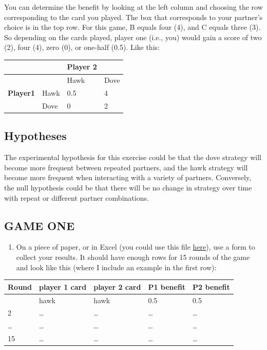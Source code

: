 \documentclass[
  a4paper]{book}
\providecommand{\tightlist}{%
  \setlength{\itemsep}{0pt}\setlength{\parskip}{0pt}}
\begin{document}
You can determine the benefit by looking at the left column and choosing the row corresponding to the card you played. The box that corresponds to your partner's choice is in the top row. For this game, B equals four (4), and C equals three (3). So depending on the cards played, player one (i.e., you) would gain a score of two (2), four (4), zero (0), or one-half (0.5). Like this:

\begin{longtable}[]{@{}llll@{}}
\toprule\noalign{}
& & Player 2 & \\
\midrule\noalign{}
\endhead
\bottomrule\noalign{}
\endlastfoot
& & Hawk & Dove \\
\textbf{Player1} & Hawk & 0.5 & 4 \\
& Dove & 0 & 2 \\
\end{longtable}

\subsection{Hypotheses}\label{hypotheses}

The experimental hypothesis for this exercise could be that the dove strategy will become more frequent between repeated partners, and the hawk strategy will become more frequent when interacting with a variety of partners. Conversely, the null hypothesis could be that there will be no change in strategy over time with repeat or different partner combinations.

\subsection{GAME ONE}\label{game-one}

\begin{enumerate}
\def\labelenumi{\arabic{enumi}.}
\setcounter{enumi}{-1}
\tightlist
\item
  On a piece of paper, or in Excel (you could use this file \href{https://www.dropbox.com/s/48lypfd6o0hi46e/Table_2_Group_behavior.xlsx?dl=1}{here}), use a form to collect your results. It should have enough rows for 15 rounds of the game and look like this (where I include an example in the first row):
\end{enumerate}

\begin{longtable}[]{@{}lllll@{}}
\toprule\noalign{}
Round & player 1 card & player 2 card & P1 benefit & P2 benefit \\
\midrule\noalign{}
\endhead
\bottomrule\noalign{}
\endlastfoot
1 & hawk & hawk & 0.5 & 0.5 \\
2 & \ldots{} & \ldots{} & \ldots{} & \ldots{} \\
\ldots{} & \ldots{} & \ldots{} & \ldots{} & \ldots{} \\
15 & \ldots{} & \ldots{} & \ldots{} & \ldots{} \\
\end{longtable}
\end{document}
